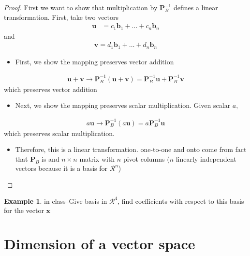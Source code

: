 \documentclass[
]{book}
\providecommand{\tightlist}{%
  \setlength{\itemsep}{0pt}\setlength{\parskip}{0pt}}
\theoremstyle{definition}
\theoremstyle{definition}
\newtheorem{example}{Example}[chapter]
\theoremstyle{definition}
\theoremstyle{definition}
\theoremstyle{remark}
\begin{document}
\begin{proof}

First we want to show that multiplication by \(\mathbf{P}_B^{-1}\) defines a linear transformation. First, take two vectors
\[
\begin{aligned}
\mathbf{u} &  = c_1 \mathbf{b}_1 + \ldots + c_n \mathbf{b}_n
\end{aligned}
\]
and
\[
\begin{aligned}
\mathbf{v} = d_1 \mathbf{b}_1 + \ldots + d_n \mathbf{b}_n
\end{aligned}
\]

\begin{itemize}
\tightlist
\item
  First, we show the mapping preserves vector addition
\end{itemize}

\[
\begin{aligned}
\mathbf{u} + \mathbf{v} \rightarrow \mathbf{P}_B^{-1} (\mathbf{u} + \mathbf{v}) =  \mathbf{P}_B^{-1} \mathbf{u} + \mathbf{P}_B^{-1} \mathbf{v}
\end{aligned}
\]
which preserves vector addition

\begin{itemize}
\tightlist
\item
  Next, we show the mapping preserves scalar multiplication. Given scalar \(a\),
\end{itemize}

\[
\begin{aligned}
a\mathbf{u} \rightarrow \mathbf{P}_B^{-1} (a \mathbf{u}) =  a \mathbf{P}_B^{-1} \mathbf{u}
\end{aligned}
\]
which preserves scalar multiplication.

\begin{itemize}
\tightlist
\item
  Therefore, this is a linear transformation. one-to-one and onto come from fact that \(\mathbf{P}_B\) is and \(n \times n\) matrix with \(n\) pivot columns (\(n\) linearly independent vectors because it is a basis for \(\mathcal{R}^n\))
\end{itemize}

\end{proof}

\begin{example}
in class--Give basis in \(\mathcal{R}^4\), find coefficients with respect to this basis for the vector \(\mathbf{x}\)
\end{example}

\hypertarget{dimension-of-a-vector-space}{%
\section{Dimension of a vector space}\label{dimension-of-a-vector-space}}
\end{document}
